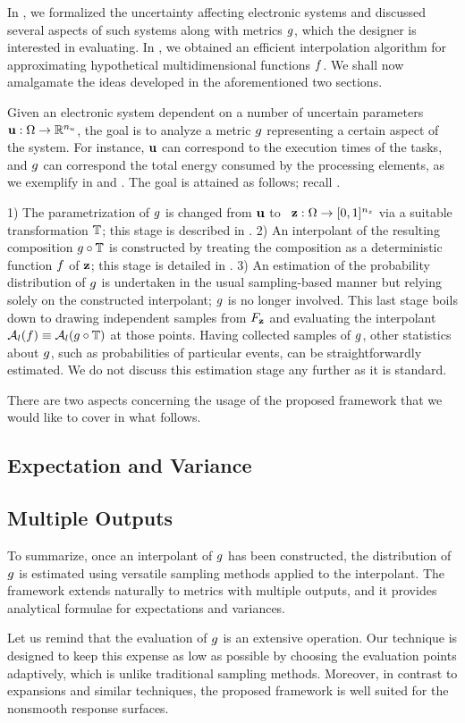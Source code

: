 In , we formalized the uncertainty affecting electronic systems
and discussed several aspects of such systems along with metrics $g$, which the
designer is interested in evaluating. In , we obtained an
efficient interpolation algorithm for approximating hypothetical
multidimensional functions $f$. We shall now amalgamate the ideas developed in
the aforementioned two sections.

Given an electronic system dependent on a number of uncertain parameters $\mathbf{u}:
\Omega \to \mathbb{R}^{n_u}$, the goal is to analyze a metric $g$ representing a
certain aspect of the system. For instance, $\mathbf{u}$ can correspond to the
execution times of the tasks, and $g$ can correspond the total energy consumed
by the processing elements, as we exemplify in  and . The
goal is attained as follows; recall .

1) The parametrization of $g$ is changed from $\mathbf{u}$ to \rvs\ $\mathbf{z}: \Omega
\to [0, 1]^{n_z}$ via a suitable transformation $\mathbb{T}$; this stage is
described in . 2) An interpolant of the resulting composition
$g \circ \mathbb{T}$ is constructed by treating the composition as a
deterministic function $f$ of $\mathbf{z}$; this stage is detailed in
. 3) An estimation of the probability distribution of $g$
is undertaken in the usual sampling-based manner but relying solely on the
constructed interpolant; $g$ is no longer involved. This last stage boils down
to drawing independent samples from $F_{\mathbf{z}}$ and evaluating the
interpolant $\mathcal{A}_{l}(f) \equiv \mathcal{A}_{l}(g \circ
\mathbb{T})$ at those points. Having collected samples of $g$, other
statistics about $g$, such as probabilities of particular events, can be
straightforwardly estimated. We do not discuss this estimation stage any further
as it is standard.

There are two aspects concerning the usage of the proposed framework that we
would like to cover in what follows.

\subsection{Expectation and Variance} 


\subsection{Multiple Outputs}


To summarize, once an interpolant of $g$ has been constructed, the distribution
of $g$ is estimated using versatile sampling methods applied to the
interpolant. The framework extends naturally to metrics with multiple outputs,
and it provides analytical formulae for expectations and variances.

Let us remind that the evaluation of $g$ is an extensive operation. Our
technique is designed to keep this expense as low as possible by choosing the
evaluation points adaptively, which is unlike traditional sampling methods.
Moreover, in contrast to  expansions and similar techniques, the proposed
framework is well suited for the nonsmooth response surfaces.

